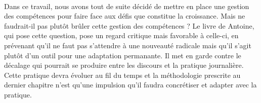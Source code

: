 \paragraph{} Dans ce travail, nous avons tout de suite décidé de mettre en place une gestion des compétences pour faire face aux défis que constitue la croissance. Mais ne faudrait-il pas plutôt brûler cette gestion des compétences ? Le livre de Antoine\citep[pp.253]{competencesbruler2006}, qui pose cette question, pose un regard critique mais favorable à celle-ci, en prévenant qu'il ne faut pas s'attendre à une nouveauté radicale mais qu'il s'agit plutôt d'un outil pour une adaptation permanante. Il met en garde contre le décalage qui pourrait se produire entre les discours et la pratique journalière. Cette pratique devra évoluer au fil du temps et la méthodologie prescrite au dernier chapitre n'est qu'une impulsion qu'il faudra concrétiser et adapter avec la pratique.   
